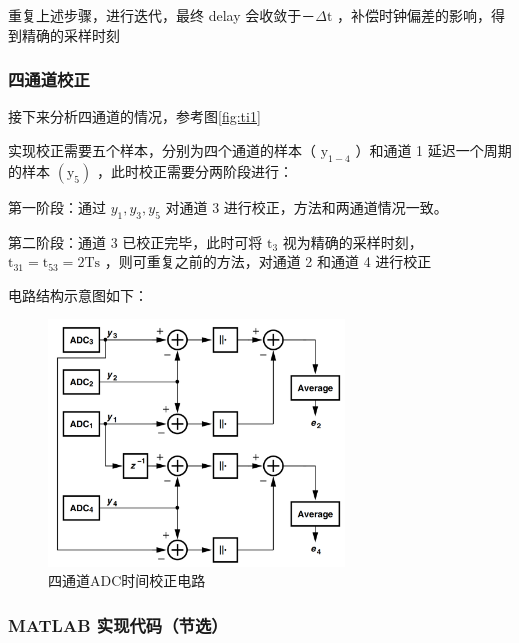 \documentclass[cs4size,a4paper]{ctexart}
\numberwithin{equation}{section}
\numberwithin{table}{section}
\numberwithin{figure}{section}
\begin{document}
		重复上述步骤，进行迭代，最终 delay 会收敛于－$\Delta \mathrm{t}$ ，补偿时钟偏差的影响，得到精确的采样时刻
		
		\subsubsection{四通道校正}
		接下来分析四通道的情况，参考图\ref{fig:ti1}

		实现校正需要五个样本，分别为四个通道的样本（ $\mathrm{y}_{1-4}$ ）和通道 1 延迟一个周期的样本 $\left(\mathrm{y}_5\right)$ ，此时校正需要分两阶段进行：
		
		第一阶段：通过 $y_1, y_3, y_5$ 对通道 3 进行校正，方法和两通道情况一致。
		
		第二阶段：通道 3 已校正完毕，此时可将 $\mathrm{t}_3$ 视为精确的采样时刻， $\mathrm{t}_{31}=\mathrm{t}_{53}=2 \mathrm{Ts}$ ，则可重复之前的方法，对通道 2 和通道 4 进行校正
		
		电路结构示意图如下：
		\begin{figure}[H]
			\centering
			\includegraphics[width=0.7\textwidth]{figure/ti2.png}
			\caption{四通道ADC时间校正电路} \label{fig:ti2}
		\end{figure}
		
		\subsubsection{MATLAB 实现代码（节选）}
		
\end{document}
